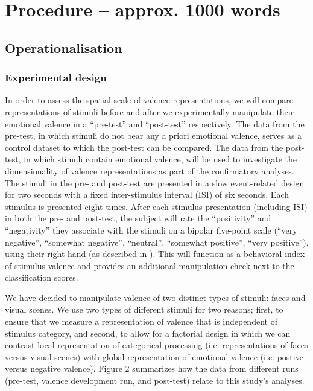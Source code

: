 \documentclass[12pt,a4paper]{article}\usepackage[]{graphicx}\usepackage[]{color}
\begin{document}
\noindent
\wordcount 

\section{Procedure \textmd{– approx. 1000 words}}
\subsection{Operationalisation}
\subsubsection{Experimental design}
In order to assess the spatial scale of valence representations, we will compare representations of stimuli before and after we experimentally manipulate their emotional valence in a ``pre-test'' and ``post-test'' respectively. The data from the pre-test, in which stimuli do not bear any a priori emotional valence, serves as a control dataset to which the post-test can be compared. The data from the post-test, in which stimuli contain emotional valence, will be used to investigate the dimensionality of valence representations as part of the confirmatory analyses. The stimuli in the pre- and post-test are presented in a slow event-related design for two seconds with a fixed inter-stimulus interval (ISI) of six seconds. Each stimulus is presented eight times. After each stimulus-presentation (including ISI) in both the pre- and post-test, the subject will rate the ``positivity'' and ``negativity'' they associate with the stimuli on a bipolar five-point scale (``very negative'', ``somewhat negative'', ``neutral'', ``somewhat positive'', ``very positive''), using their right hand (as described in \citealp{diaz2013}). This will function as a behavioral index of stimulus-valence and provides an additional manipulation check next to the classification scores.   

We have decided to manipulate valence of two distinct types of stimuli: faces and visual scenes. We use two types of different stimuli for two reasons; first, to ensure that we measure a representation of valence that is independent of stimulus category, and second, to allow for a factorial design in which we can contrast local representation of categorical processing (i.e. representations of faces versus visual scenes) with global representation of emotional valence (i.e. postive versus negative valence). Figure 2 summarizes how the data from different runs (pre-test, valence development run, and post-test) relate to this study's analyses.
\end{document}
